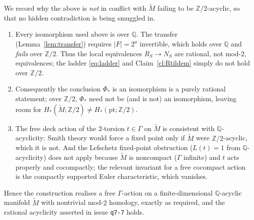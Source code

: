 \documentclass[12pt]{article}
\begin{document}
We record why the above is \emph{not} in conflict with $\widetilde M$ failing
to be $\mathbb{Z}/2$-acyclic, so that no hidden contradiction is being smuggled
in.

\begin{enumerate}
\item Every isomorphism used above is over $\mathbb{Q}$. The transfer
(Lemma~\ref{lem:transfer}) requires $|F|=2^a$ invertible, which holds over
$\mathbb{Q}$ and \emph{fails} over $\mathbb{Z}/2$. Thus the local equivalences
$R_S\to N_S$ are rational, not mod-$2$, equivalences; the ladder
\eqref{eq:ladder} and Claim~\ref{cl:Rtildem} simply do not hold over
$\mathbb{Z}/2$.
\item Consequently the conclusion $\Phi_*$ is an isomorphism is a purely
rational statement; over $\mathbb{Z}/2$, $\Phi_*$ need not be (and is not) an
isomorphism, leaving room for $H_*(\widetilde M;\mathbb{Z}/2)\neq
H_*(\mathrm{pt};\mathbb{Z}/2)$.
\item The free deck action of the $2$-torsion $t\in\Gamma$ on $\widetilde M$ is
consistent with $\mathbb{Q}$-acyclicity: Smith theory would force a fixed point
only if $\widetilde M$ were $\mathbb{Z}/2$-acyclic, which it is not. And the
Lefschetz fixed-point obstruction ($L(t)=1$ from $\mathbb{Q}$-acyclicity) does
not apply because $\widetilde M$ is noncompact ($\Gamma$ infinite) and $t$ acts
properly and cocompactly; the relevant invariant for a free cocompact action
is the compactly supported Euler characteristic, which vanishes.
\end{enumerate}

Hence the construction realises a free $\Gamma$-action on a finite-dimensional
$\mathbb{Q}$-acyclic manifold $\widetilde M$ with nontrivial mod-$2$ homology,
exactly as required, and the rational acyclicity asserted in issue
\texttt{q7-7} holds.
\end{document}
